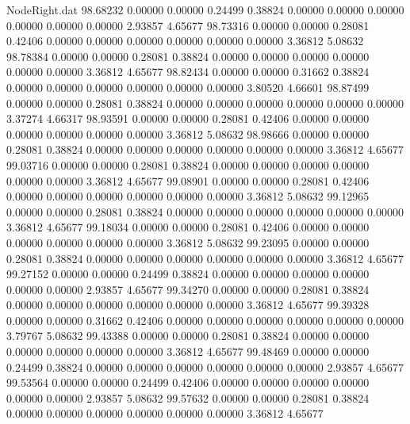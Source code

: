\begin{filecontents}{NodeRight.dat}
  98.68232    0.00000    0.00000     0.24499    0.38824    0.00000    0.00000    0.00000    0.00000    0.00000    0.00000    2.93857    4.65677
  98.73316    0.00000    0.00000     0.28081    0.42406    0.00000    0.00000    0.00000    0.00000    0.00000    0.00000    3.36812    5.08632
  98.78384    0.00000    0.00000     0.28081    0.38824    0.00000    0.00000    0.00000    0.00000    0.00000    0.00000    3.36812    4.65677
  98.82434    0.00000    0.00000     0.31662    0.38824    0.00000    0.00000    0.00000    0.00000    0.00000    0.00000    3.80520    4.66601
  98.87499    0.00000    0.00000     0.28081    0.38824    0.00000    0.00000    0.00000    0.00000    0.00000    0.00000    3.37274    4.66317
  98.93591    0.00000    0.00000     0.28081    0.42406    0.00000    0.00000    0.00000    0.00000    0.00000    0.00000    3.36812    5.08632
  98.98666    0.00000    0.00000     0.28081    0.38824    0.00000    0.00000    0.00000    0.00000    0.00000    0.00000    3.36812    4.65677
  99.03716    0.00000    0.00000     0.28081    0.38824    0.00000    0.00000    0.00000    0.00000    0.00000    0.00000    3.36812    4.65677
  99.08901    0.00000    0.00000     0.28081    0.42406    0.00000    0.00000    0.00000    0.00000    0.00000    0.00000    3.36812    5.08632
  99.12965    0.00000    0.00000     0.28081    0.38824    0.00000    0.00000    0.00000    0.00000    0.00000    0.00000    3.36812    4.65677
  99.18034    0.00000    0.00000     0.28081    0.42406    0.00000    0.00000    0.00000    0.00000    0.00000    0.00000    3.36812    5.08632
  99.23095    0.00000    0.00000     0.28081    0.38824    0.00000    0.00000    0.00000    0.00000    0.00000    0.00000    3.36812    4.65677
  99.27152    0.00000    0.00000     0.24499    0.38824    0.00000    0.00000    0.00000    0.00000    0.00000    0.00000    2.93857    4.65677
  99.34270    0.00000    0.00000     0.28081    0.38824    0.00000    0.00000    0.00000    0.00000    0.00000    0.00000    3.36812    4.65677
  99.39328    0.00000    0.00000     0.31662    0.42406    0.00000    0.00000    0.00000    0.00000    0.00000    0.00000    3.79767    5.08632
  99.43388    0.00000    0.00000     0.28081    0.38824    0.00000    0.00000    0.00000    0.00000    0.00000    0.00000    3.36812    4.65677
  99.48469    0.00000    0.00000     0.24499    0.38824    0.00000    0.00000    0.00000    0.00000    0.00000    0.00000    2.93857    4.65677
  99.53564    0.00000    0.00000     0.24499    0.42406    0.00000    0.00000    0.00000    0.00000    0.00000    0.00000    2.93857    5.08632
  99.57632    0.00000    0.00000     0.28081    0.38824    0.00000    0.00000    0.00000    0.00000    0.00000    0.00000    3.36812    4.65677

\end{filecontents}
